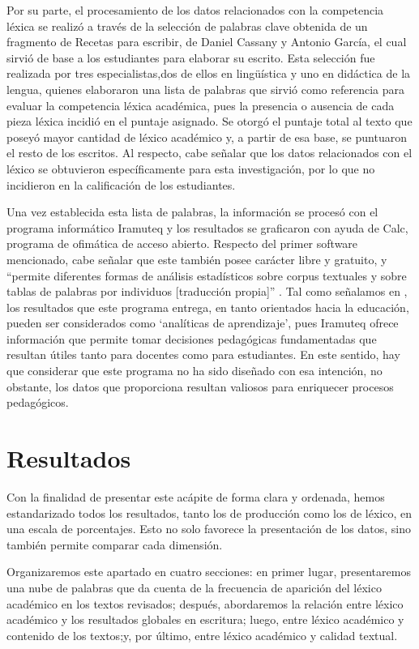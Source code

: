 \documentclass{textolivre}
\begin{document}
Por su parte, el procesamiento de los datos relacionados con la competencia
léxica se realizó a través de la selección de palabras clave obtenida de un
fragmento de Recetas para escribir, de Daniel Cassany y Antonio García, el cual
sirvió de base a los estudiantes para elaborar su escrito. Esta selección fue
realizada por tres especialistas,dos de ellos en lingüística y uno en didáctica
de la lengua, quienes elaboraron una lista de palabras que sirvió como
referencia para evaluar la competencia léxica académica, pues la presencia o
ausencia de cada pieza léxica incidió en el puntaje asignado. Se otorgó
el puntaje total al texto que poseyó mayor cantidad de léxico académico y, a
partir de esa base, se puntuaron el resto de los escritos. Al respecto, cabe
señalar que los datos relacionados con el léxico se obtuvieron específicamente
para esta investigación, por lo que no incidieron en la calificación de los
estudiantes.

Una vez establecida esta lista de palabras, la información se procesó con
el programa informático Iramuteq y los resultados se graficaron con ayuda de
Calc, programa de ofimática de acceso abierto. Respecto del primer software
mencionado, cabe señalar que este también posee carácter libre y gratuito, y
“permite diferentes formas de análisis estadísticos sobre corpus textuales y
sobre tablas de palabras por individuos [traducción propia]” \cite[p. 513]{Camargo2013}.
Tal como señalamos en , los resultados que este programa
entrega, en tanto orientados hacia la educación, pueden ser considerados como
‘analíticas de aprendizaje’, pues Iramuteq ofrece información que permite tomar
decisiones pedagógicas fundamentadas que resultan útiles tanto para docentes
como para estudiantes. En este sentido, hay que considerar que este programa no
ha sido diseñado con esa intención, no obstante, los datos que proporciona
resultan valiosos para enriquecer procesos pedagógicos.



\section{Resultados}\label{sec-resultados}
Con la finalidad de presentar este acápite de forma clara y ordenada,
hemos estandarizado todos los resultados, tanto los de producción como los de
léxico, en una escala de porcentajes. Esto no solo favorece la presentación de
los datos, sino también permite comparar cada dimensión.

Organizaremos este apartado en cuatro secciones: en primer lugar,
presentaremos una nube de palabras que da cuenta de la frecuencia de aparición
del léxico académico en los textos revisados; después, abordaremos la relación
entre léxico académico y los resultados globales en escritura; luego, entre
léxico académico y contenido de los textos;y, por último, entre léxico
académico y calidad textual.
\end{document}
